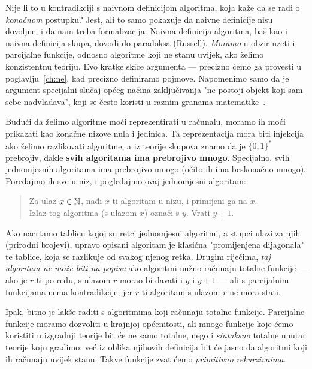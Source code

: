 \begin{napomena}[{name=[Russellov paradoks s totalnim algoritmima]}]\label{nap:diagtot}
	Nije li to u kontradikciji s naivnom definicijom algoritma, koja kaže da se radi o \emph{konačnom} postupku? Jest, ali to samo pokazuje da naivne definicije nisu dovoljne, i da nam treba formalizacija. Naivna definicija algoritma, baš kao i naivna definicija skupa, dovodi do paradoksa (Russell). \emph{Moramo} u obzir uzeti i parcijalne funkcije, odnosno algoritme koji ne stanu uvijek, ako želimo konzistentnu teoriju. Evo kratke skice argumenta --- precizno ćemo ga provesti u poglavlju~\ref{ch:ne}, kad precizno definiramo pojmove. Napomenimo samo da je argument specijalni slučaj općeg načina zaključivanja "ne postoji objekt koji sam sebe nadvladava", koji se često koristi u raznim granama matematike~\cite{url:tao}.

Budući da želimo algoritme moći reprezentirati u računalu, moramo ih moći prikazati kao konačne nizove nula i jedinica. Ta reprezentacija mora biti injekcija ako želimo razlikovati algoritme, a iz teorije skupova znamo da je $\{0,1\}^*$ prebrojiv\!, dakle \textbf{svih algoritama ima prebrojivo mnogo}. Specijalno, svih jednomjesnih algoritama ima prebrojivo mnogo (očito ih ima beskonačno mnogo). Poredajmo ih sve u niz, i pogledajmo ovaj jednomjesni algoritam:
\begin{quote}
	Za ulaz $x\in{\mathbb N}$, nađi $x$-ti algoritam u nizu, i primijeni ga na $x$.\\
	Izlaz tog algoritma (s ulazom $x$) označi s $y$. Vrati $y+1$.
\end{quote}
	Ako nacrtamo tablicu kojoj su retci jednomjesni algoritmi, a stupci ulazi za njih (prirodni brojevi), upravo opisani algoritam je klasična "promijenjena dijagonala" te tablice, koja se razlikuje od svakog njenog retka. Drugim riječima, \emph{taj algoritam ne može biti na popisu} ako algoritmi nužno računaju totalne funkcije --- ako je $r$-ti po redu, s ulazom $r$ morao bi davati i $y$ i $y+1$ --- ali s parcijalnim funkcijama nema kontradikcije, jer $r$-ti algoritam s ulazom $r$ ne mora stati.
\end{napomena}

Ipak, bitno je lakše raditi s algoritmima koji računaju totalne funkcije. Parcijalne funkcije moramo dozvoliti u krajnjoj općenitosti, ali mnoge funkcije koje ćemo koristiti u izgradnji teorije bit će ne samo totalne, nego i \emph{sintaksno} totalne unutar teorije koju gradimo: već iz oblika njihovih definicija bit će jasno da algoritmi koji ih računaju uvijek stanu. Takve funkcije zvat ćemo \emph{primitivno rekurzivnima}.

